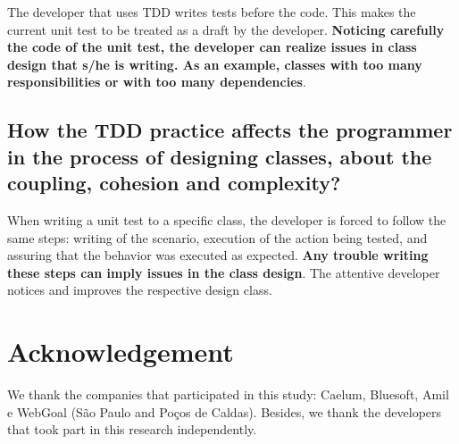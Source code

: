 \documentclass[times]{speauth}
\begin{document}
The developer that uses TDD writes tests before the code. This makes
the current unit test to be treated as a draft by the developer.
\textbf{Noticing carefully the code of the unit test, the developer can
realize issues in class design that s/he is writing. As an example,
classes with too many responsibilities or with too many dependencies}.

\subsection{How the TDD practice affects the programmer in the process of designing
classes, about the coupling, cohesion and complexity?}

When writing a unit test to a specific class, the developer is forced to follow
the same steps: writing of the scenario, execution of the action being
tested, and assuring that the behavior was executed as
expected.
\textbf{Any trouble writing these steps can imply issues in the class design}. 
The attentive developer notices and improves the respective design class.

\section*{Acknowledgement}

We thank the companies that participated in this study: Caelum, Bluesoft,
Amil e WebGoal (São Paulo and Poços de Caldas). Besides, we thank the
developers that took part in this research independently.
\end{document}
